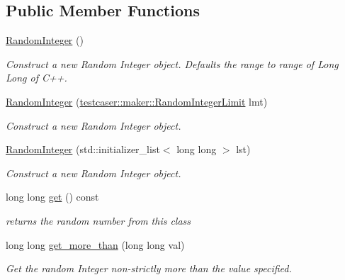 \subsection*{Public Member Functions}
\begin{DoxyCompactItemize}
\item 
\mbox{\label{classtestcaser_1_1maker_1_1types_1_1RandomInteger_aee8b13d2d5bad5355924313b56d321c4}} 
\hyperlink{classtestcaser_1_1maker_1_1types_1_1RandomInteger_aee8b13d2d5bad5355924313b56d321c4}{Random\+Integer} ()
\begin{DoxyCompactList}\small\item\em Construct a new Random Integer object. Defaults the range to range of Long Long of C++. \end{DoxyCompactList}\item 
\hyperlink{classtestcaser_1_1maker_1_1types_1_1RandomInteger_a026bc0b7613813494afce8066fb997ea}{Random\+Integer} (\hyperlink{classtestcaser_1_1maker_1_1RandomIntegerLimit}{testcaser\+::maker\+::\+Random\+Integer\+Limit} lmt)
\begin{DoxyCompactList}\small\item\em Construct a new Random Integer object. \end{DoxyCompactList}\item 
\hyperlink{classtestcaser_1_1maker_1_1types_1_1RandomInteger_ae126be1bc8d04520b063924e57ccedc6}{Random\+Integer} (std\+::initializer\+\_\+list$<$ long long $>$ lst)
\begin{DoxyCompactList}\small\item\em Construct a new Random Integer object. \end{DoxyCompactList}\item 
long long \hyperlink{classtestcaser_1_1maker_1_1types_1_1RandomInteger_a3b7754ca1c579f58b959ca6adb483a51}{get} () const
\begin{DoxyCompactList}\small\item\em returns the random number from this class \end{DoxyCompactList}\item 
long long \hyperlink{classtestcaser_1_1maker_1_1types_1_1RandomInteger_ace51a32acc0f219b70aa00d1cd2604c5}{get\+\_\+more\+\_\+than} (long long val)
\begin{DoxyCompactList}\small\item\em Get the random Integer non-\/strictly more than the value specified. \end{DoxyCompactList}\item 

\end{DoxyCompactItemize}

